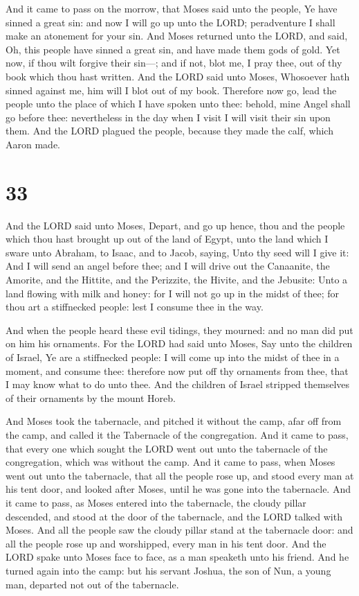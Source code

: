 And it came to pass on the morrow, that Moses said unto
the people, Ye have sinned a great sin: and now I will go up unto the
LORD; peradventure I shall make an atonement for your sin. 
And Moses returned unto the LORD, and said, Oh, this people have sinned
a great sin, and have made them gods of gold.  Yet now, if
thou wilt forgive their sin---; and if not, blot me, I pray thee, out of
thy book which thou hast written.  And the LORD said unto
Moses, Whosoever hath sinned against me, him will I blot out of my book.
 Therefore now go, lead the people unto the place of which
I have spoken unto thee: behold, mine Angel shall go before thee:
nevertheless in the day when I visit I will visit their sin upon them.
 And the LORD plagued the people, because they made the
calf, which Aaron made.

\hypertarget{section-32}{%
\section{33}\label{section-32}}

 And the LORD said unto Moses, Depart, and go up hence, thou
and the people which thou hast brought up out of the land of Egypt, unto
the land which I sware unto Abraham, to Isaac, and to Jacob, saying,
Unto thy seed will I give it:  And I will send an angel
before thee; and I will drive out the Canaanite, the Amorite, and the
Hittite, and the Perizzite, the Hivite, and the Jebusite: 
Unto a land flowing with milk and honey: for I will not go up in the
midst of thee; for thou art a stiffnecked people: lest I consume thee in
the way.

 And when the people heard these evil tidings, they mourned:
and no man did put on him his ornaments.  For the LORD had
said unto Moses, Say unto the children of Israel, Ye are a stiffnecked
people: I will come up into the midst of thee in a moment, and consume
thee: therefore now put off thy ornaments from thee, that I may know
what to do unto thee.  And the children of Israel stripped
themselves of their ornaments by the mount Horeb.

 And Moses took the tabernacle, and pitched it without the
camp, afar off from the camp, and called it the Tabernacle of the
congregation. And it came to pass, that every one which sought the LORD
went out unto the tabernacle of the congregation, which was without the
camp.  And it came to pass, when Moses went out unto the
tabernacle, that all the people rose up, and stood every man at his tent
door, and looked after Moses, until he was gone into the tabernacle.
 And it came to pass, as Moses entered into the tabernacle,
the cloudy pillar descended, and stood at the door of the tabernacle,
and the LORD talked with Moses.  And all the people saw the
cloudy pillar stand at the tabernacle door: and all the people rose up
and worshipped, every man in his tent door.  And the LORD
spake unto Moses face to face, as a man speaketh unto his friend. And he
turned again into the camp: but his servant Joshua, the son of Nun, a
young man, departed not out of the tabernacle.

